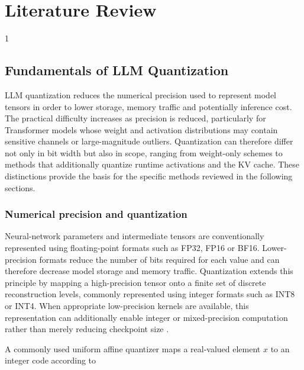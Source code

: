 \doublespacing %

\chapter{Literature Review}
\label{ch2}

\begin{spacing}{1} %
\minitoc %
\end{spacing} %
\thesisspacing %




\section{Fundamentals of LLM Quantization}

LLM quantization reduces the numerical precision used to represent model tensors in order to lower storage, memory traffic and potentially inference cost. The practical difficulty increases as precision is reduced, particularly for Transformer models whose weight and activation distributions may contain sensitive channels or large-magnitude outliers. Quantization can therefore differ not only in bit width but also in scope, ranging from weight-only schemes to methods that additionally quantize runtime activations and the \ac{KV} cache. These distinctions provide the basis for the specific methods reviewed in the following sections.


\subsection{Numerical precision and quantization}
Neural-network parameters and intermediate tensors are conventionally represented using floating-point formats such as FP32, FP16 or BF16. Lower-precision formats reduce the number of bits required for each value and can therefore decrease model storage and memory traffic. Quantization extends this principle by mapping a high-precision tensor onto a finite set of discrete reconstruction levels, commonly represented using integer formats such as INT8 or INT4. When appropriate low-precision kernels are available, this representation can additionally enable integer or mixed-precision computation rather than merely reducing checkpoint size \cite{jacob2017quantizationtrainingneuralnetworks}.

A commonly used uniform affine quantizer maps a real-valued element \(x\) to an integer code according to


